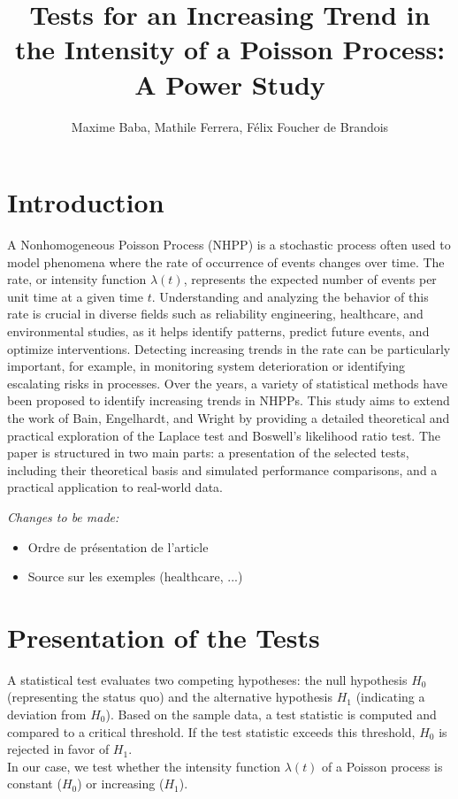 \documentclass{journalstyle}
\title{Tests for an Increasing Trend in the Intensity of a Poisson Process: A Power Study}
\author{Maxime Baba, Mathile Ferrera, Félix Foucher de Brandois}
\begin{document}
\maketitle




\section*{Introduction}

A Nonhomogeneous Poisson Process (NHPP) is a stochastic process often used to model phenomena where the rate of occurrence of events changes over time.
The rate, or intensity function $\lambda(t)$, represents the expected number of events per unit time at a given time $t$.
Understanding and analyzing the behavior of this rate is crucial in diverse fields such as reliability engineering, healthcare, and environmental studies, as it helps identify patterns, predict future events, and optimize interventions.
Detecting increasing trends in the rate can be particularly important, for example, in monitoring system deterioration or identifying escalating risks in processes.
Over the years, a variety of statistical methods have been proposed to identify increasing trends in NHPPs.
This study aims to extend the work of Bain, Engelhardt, and Wright \cite{BainEngelhardtWright} by providing a detailed theoretical and practical exploration of the Laplace test and Boswell’s likelihood ratio test.
The paper is structured in two main parts: a presentation of the selected tests, including their theoretical basis and simulated performance comparisons, and a practical application to real-world data.

\textit{Changes to be made:}
\begin{itemize}
    \item Ordre de présentation de l'article
    \item Source sur les exemples (healthcare, ...)
\end{itemize}

\section{Presentation of the Tests}

A statistical test evaluates two competing hypotheses: the null hypothesis $H_0$ (representing the status quo) and the alternative hypothesis $H_1$ (indicating a deviation from $H_0$).
Based on the sample data, a test statistic is computed and compared to a critical threshold.
If the test statistic exceeds this threshold, $H_0$ is rejected in favor of $H_1$. \\
In our case, we test whether the intensity function $\lambda(t)$ of a Poisson process is constant ($H_0$) or increasing ($H_1$).
\end{document}
